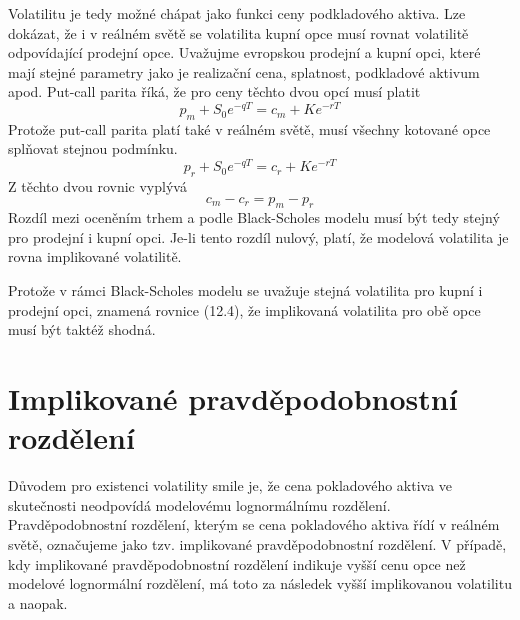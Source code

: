 \documentclass[a4paper]{book}
\begin{document}
Volatilitu je tedy možné chápat jako funkci ceny podkladového aktiva. Lze dokázat, že i v reálném světě se volatilita kupní opce musí rovnat volatilitě odpovídající prodejní opce. Uvažujme evropskou prodejní a kupní opci, které mají stejné parametry jako je realizační cena, splatnost, podkladové aktivum apod. Put-call parita říká, že pro ceny těchto dvou opcí musí platit
\begin{equation*}
p_m +S_0e^{-qT} = c_m + Ke^{-rT}
\end{equation*}
Protože put-call parita platí také v reálném světě, musí všechny kotované opce splňovat stejnou podmínku.
\begin{equation*}
p_r +S_0e^{-qT} = c_r + Ke^{-rT}
\end{equation*}
Z těchto dvou rovnic vyplývá
\begin{equation}
c_m - c_r = p_m - p_r
\end{equation}
Rozdíl mezi oceněním trhem a podle Black-Scholes modelu musí být tedy stejný pro prodejní i kupní opci. Je-li tento rozdíl nulový, platí, že modelová volatilita je rovna implikované volatilitě.

Protože v rámci Black-Scholes modelu se uvažuje stejná volatilita pro kupní i prodejní opci, znamená rovnice (12.4), že implikovaná volatilita pro obě opce musí být taktéž shodná.

\section{Implikované pravděpodobnostní rozdělení}

Důvodem pro existenci volatility smile je, že cena pokladového aktiva ve skutečnosti neodpovídá modelovému lognormálnímu rozdělení. Pravděpodobnostní rozdělení, kterým se cena pokladového aktiva řídí v reálném světě, označujeme jako tzv. implikované pravděpodobnostní rozdělení. V případě, kdy implikované pravděpodobnostní rozdělení indikuje vyšší cenu opce než modelové lognormální rozdělení, má toto za následek vyšší implikovanou volatilitu a naopak.
\end{document}
